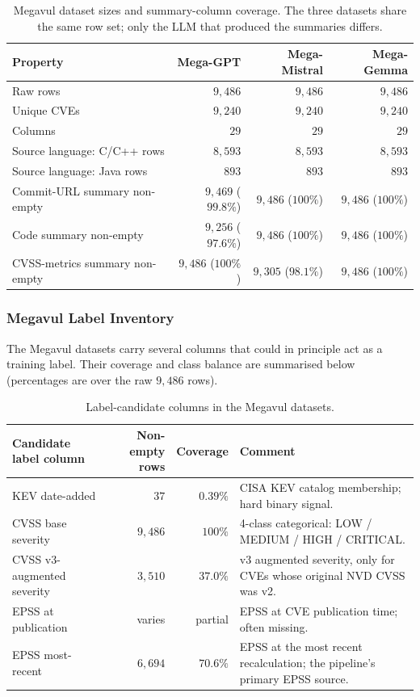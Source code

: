 \documentclass[11pt]{article}
\begin{document}
\begin{table}[h]
\centering
\small
\begin{tabular}{lrrr}
\toprule
Property & Mega-GPT & Mega-Mistral & Mega-Gemma \\
\midrule
Raw rows                       & $9{,}486$ & $9{,}486$ & $9{,}486$ \\
Unique CVEs                    & $9{,}240$ & $9{,}240$ & $9{,}240$ \\
Columns                        & $29$      & $29$      & $29$ \\
Source language: C/C++ rows    & $8{,}593$ & $8{,}593$ & $8{,}593$ \\
Source language: Java rows     & $893$     & $893$     & $893$ \\
Commit-URL summary non-empty   & $9{,}469$ ($99.8\%$) & $9{,}486$ ($100\%$) & $9{,}486$ ($100\%$) \\
Code summary non-empty         & $9{,}256$ ($97.6\%$) & $9{,}486$ ($100\%$) & $9{,}486$ ($100\%$) \\
CVSS-metrics summary non-empty & $9{,}486$ ($100\%$)  & $9{,}305$ ($98.1\%$) & $9{,}486$ ($100\%$) \\
\bottomrule
\end{tabular}
\caption{Megavul dataset sizes and summary-column coverage. The three
datasets share the same row set; only the LLM that produced the
summaries differs.}
\end{table}

\subsubsection{Megavul Label Inventory}

The Megavul datasets carry several columns that could in principle act
as a training label. Their coverage and class balance are summarised
below (percentages are over the raw $9{,}486$ rows).

\begin{table}[h]
\centering
\small
\begin{tabular}{lrrl}
\toprule
Candidate label column & Non-empty rows & Coverage & Comment \\
\midrule
KEV date-added & $37$ & $0.39\%$ & CISA KEV catalog membership; hard binary signal. \\
CVSS base severity & $9{,}486$ & $100\%$ & 4-class categorical: LOW / MEDIUM / HIGH / CRITICAL. \\
CVSS v3-augmented severity & $3{,}510$ & $37.0\%$ & v3 augmented severity, only for CVEs whose original NVD CVSS was v2. \\
EPSS at publication & varies & partial & EPSS at CVE publication time; often missing. \\
EPSS most-recent & $6{,}694$ & $70.6\%$ & EPSS at the most recent recalculation; the pipeline's primary EPSS source. \\
\bottomrule
\end{tabular}
\caption{Label-candidate columns in the Megavul datasets.}
\end{table}
\end{document}
